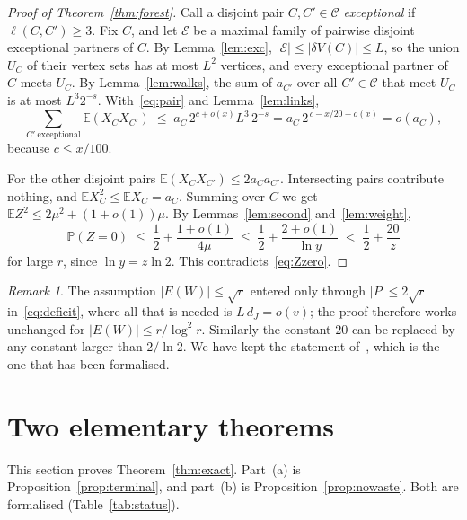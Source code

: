 \documentclass[11pt]{article}
\theoremstyle{definition}
\theoremstyle{remark}
\newtheorem{remark}[theorem]{Remark}
\newcommand{\PP}{\mathbb{P}}
\newcommand{\EE}{\mathbb{E}}
\numberwithin{equation}{section}
\begin{document}
\begin{proof}[Proof of Theorem~\ref{thm:forest}]
Call a disjoint pair $C,C'\in\mathcal{C}$ \emph{exceptional} if $\ell(C,C')\ge3$. Fix $C$, and let
$\mathcal{E}$ be a maximal family of pairwise disjoint exceptional partners of $C$. By
Lemma~\ref{lem:exc}, $|\mathcal{E}|\le|\delta V(C)|\le L$, so the union $U_C$ of their vertex sets
has at most $L^{2}$ vertices, and every exceptional partner of $C$ meets $U_C$. By
Lemma~\ref{lem:walks}, the sum of $a_{C'}$ over all $C'\in\mathcal{C}$ that meet $U_C$ is at most
$L^{3}2^{-s}$. With~\eqref{eq:pair} and Lemma~\ref{lem:links},
\[
  \sum_{C'\ \mathrm{exceptional}}\EE(X_CX_{C'})\;\le\;a_C\,2^{c+o(x)}L^{3}\,2^{-s}
  =a_C\,2^{\,c-x/20+o(x)}=o(a_C),
\]
because $c\le x/100$.

For the other disjoint pairs $\EE(X_CX_{C'})\le2a_Ca_{C'}$. Intersecting pairs contribute nothing,
and $\EE X_C^{2}\le\EE X_C=a_C$. Summing over $C$ we get
$\EE Z^{2}\le2\mu^{2}+(1+o(1))\mu$. By Lemmas~\ref{lem:second} and~\ref{lem:weight},
\[
  \PP(Z=0)\;\le\;\frac12+\frac{1+o(1)}{4\mu}\;\le\;\frac12+\frac{2+o(1)}{\ln y}\;<\;\frac12+\frac{20}{z}
\]
for large $r$, since $\ln y=z\ln2$. This contradicts~\eqref{eq:Zzero}.
\end{proof}

\begin{remark}\label{rem:range}
The assumption $|E(W)|\le\sqrt r$ entered only through $|P|\le2\sqrt r$ in~\eqref{eq:deficit}, where
all that is needed is $L\,d_J=o(v)$; the proof therefore works unchanged for
$|E(W)|\le r/\log^{2}r$. Similarly the constant $20$ can be replaced by any constant larger than
$2/\ln2$. We have kept the statement of~\cite{KNT}, which is the one that has been formalised.
\end{remark}
\section{Two elementary theorems}\label{sec:exact}

This section proves Theorem~\ref{thm:exact}. Part~(a) is Proposition~\ref{prop:terminal}, and
part~(b) is Proposition~\ref{prop:nowaste}. Both are formalised (Table~\ref{tab:status}).
\end{document}
